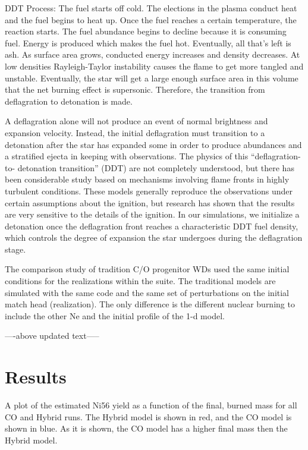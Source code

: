 \documentclass[iop,apj]{emulateapj}
\begin{document}
DDT Process:
The fuel starts off cold. The elections in the plasma conduct heat
and the fuel begins to heat up. Once the fuel reaches a certain
temperature, the reaction starts. The fuel abundance begins to
decline because it is consuming fuel. Energy is produced which
makes the fuel hot. Eventually, all that’s left is ash. As
surface area grows, conducted energy increases and density
decreases. At low densities Rayleigh-Taylor instability causes
the flame to get more tangled and unstable. Eventually, the
star will get a large enough surface area in this volume that
the net burning effect is supersonic. Therefore, the transition
from deflagration to detonation is made.

A deflagration alone will not produce an event of normal
brightness and expansion velocity. Instead, the initial
deflagration must transition to a detonation after the star has
expanded some in order to produce abundances and a stratified
ejecta in keeping with observations. The physics of this
“deflagration-to- detonation transition” (DDT) are not
completely understood, but there has been considerable study
based on mechanisms involving flame fronts in highly turbulent
conditions. These models generally reproduce the observations
under certain assumptions about the ignition, but research has
shown that the results are very sensitive to the details of the
ignition. In our simulations, we initialize a detonation once
the deflagration front reaches a characteristic DDT fuel density,
which controls the degree of expansion the star undergoes during
the deflagration stage.

The comparison study of tradition C/O progenitor WDs used the same initial
conditions for the realizations within the suite. The traditional models
are simulated with the same code and the same set of perturbations on the
initial match head (realization). The only difference is the different
nuclear burning to include the other Ne and the initial profile of the
1-d model.

----above updated text-----



\section{Results}

A plot of the estimated Ni56 yield as a function of the final, burned mass
for all CO and Hybrid runs. The Hybrid model is shown in red, and the CO
model is shown in blue. As it is shown, the CO model has a higher final mass
then the Hybrid model. 
\end{document}
